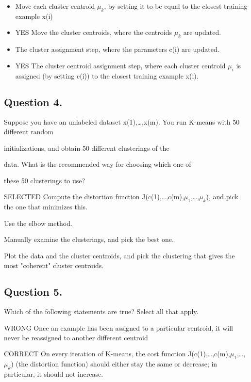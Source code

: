 \documentclass[11pt]{article} %
\begin{document}
\begin{itemize}
	\item Move each cluster centroid $\mu_k$, by setting it to be equal to the closest training example x(i)
	
	\item YES Move the cluster centroids, where the centroids $\mu_k$ are updated.
	
	\item The cluster assignment step, where the parameters c(i) are updated.
	
	\item YES The cluster centroid assignment step, where each cluster centroid $\mu_i$ is assigned (by setting c(i)) to the closest training example x(i).
	\end{itemize}
\subsection{ Question 4. }
	Suppose you have an unlabeled dataset {x(1),…,x(m)}. You run K-means with 50 different random
	
	initializations, and obtain 50 different clusterings of the
	
	data. What is the recommended way for choosing which one of
	
	these 50 clusterings to use?
	
	
	SELECTED Compute the distortion function J(c(1),…,c(m),$\mu_1$,…,$\mu_k$), and pick the one that minimizes this.
	
	Use the elbow method.
	
	Manually examine the clusterings, and pick the best one.
	
	Plot the data and the cluster centroids, and pick the clustering that gives the most "coherent" cluster centroids.
\subsection{ Question 5. } 
	Which of the following statements are true? Select all that apply.
	
	WRONG Once an example has been assigned to a particular centroid, it will never be reassigned to another different centroid
	
	CORRECT On every iteration of K-means, the cost function J(c(1),…,c(m),$\mu_1$,…,$\mu_k$) (the distortion function) should either stay the same or decrease; in particular, it should not increase.
	
\end{document}
